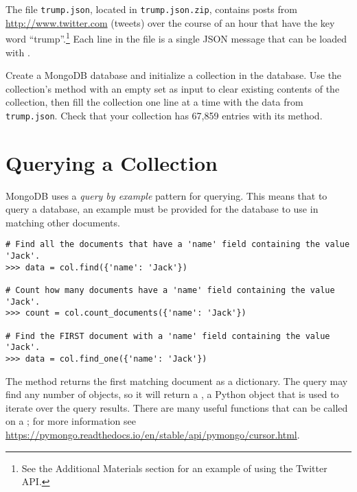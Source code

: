 \begin{problem} %
The file \texttt{trump.json}, located in \texttt{trump.json.zip}, contains posts from \url{http://www.twitter.com} (tweets) over the course of an hour that have the key word ``trump''.\footnote{See the Additional Materials section for an example of using the Twitter API.}
Each line in the file is a single JSON message that can be loaded with .

Create a MongoDB database and initialize a collection in the database.
Use the collection's  method with an empty set as input to clear existing contents of the collection, then fill the collection one line at a time with the data from \texttt{trump.json}.
Check that your collection has 67,859 entries with its  method.
\label{prob:mongo-fill-db}
\end{problem}

\section*{Querying a Collection} %

MongoDB uses a \emph{query by example} pattern for querying.  This means that to query a database, an example must be provided for the database to use in matching other documents.
\begin{lstlisting}
# Find all the documents that have a 'name' field containing the value 'Jack'.
>>> data = col.find({'name': 'Jack'})

# Count how many documents have a 'name' field containing the value 'Jack'.
>>> count = col.count_documents({'name': 'Jack'})

# Find the FIRST document with a 'name' field containing the value 'Jack'.
>>> data = col.find_one({'name': 'Jack'})
\end{lstlisting}

The  method returns the first matching document as a dictionary.
The  query may find any number of objects, so it will return a , a Python object that is used to iterate over the query results.
There are many useful functions that can be called on a ; for more information see \url{https://pymongo.readthedocs.io/en/stable/api/pymongo/cursor.html}.

